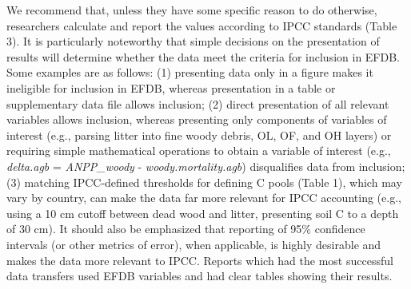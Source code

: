 \documentclass[, manuscript]{copernicus}
\begin{document}
We recommend that, unless they have some specific reason to do
otherwise, researchers calculate and report the values according to IPCC
standards (Table 3). It is particularly noteworthy that simple decisions
on the presentation of results will determine whether the data meet the
criteria for inclusion in EFDB. Some examples are as follows: (1)
presenting data only in a figure makes it ineligible for inclusion in
EFDB, whereas presentation in a table or supplementary data file allows
inclusion; (2) direct presentation of all relevant variables allows
inclusion, whereas presenting only components of variables of interest
(e.g., parsing litter into fine woody debris, OL, OF, and OH layers) or
requiring simple mathematical operations to obtain a variable of
interest (e.g., \emph{delta.agb} = \emph{ANPP\_woody} -
\emph{woody.mortality.agb}) disqualifies data from inclusion; (3)
matching IPCC-defined thresholds for defining C pools (Table 1), which
may vary by country, can make the data far more relevant for IPCC
accounting (e.g., using a 10 cm cutoff between dead wood and litter,
presenting soil C to a depth of 30 cm). It should also be emphasized
that reporting of 95\% confidence intervals (or other metrics of error),
when applicable, is highly desirable and makes the data more relevant to
IPCC. Reports which had the most successful data transfers used EFDB
variables and had clear tables showing their results.
\end{document}
